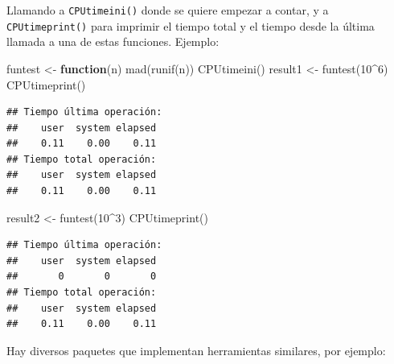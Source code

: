 \documentclass[
]{book}
\newenvironment{Shaded}{\begin{snugshade}}{\end{snugshade}}
\newcommand{\ControlFlowTok}[1]{\textcolor[rgb]{0.13,0.29,0.53}{\textbf{#1}}}
\newcommand{\DecValTok}[1]{\textcolor[rgb]{0.00,0.00,0.81}{#1}}
\newcommand{\FunctionTok}[1]{\textcolor[rgb]{0.00,0.00,0.00}{#1}}
\newcommand{\NormalTok}[1]{#1}
\newcommand{\OtherTok}[1]{\textcolor[rgb]{0.56,0.35,0.01}{#1}}
\newcommand{\SpecialCharTok}[1]{\textcolor[rgb]{0.00,0.00,0.00}{#1}}
\theoremstyle{break}
\theoremstyle{nonumberplain}
\begin{document}
Llamando a \texttt{CPUtimeini()} donde se quiere empezar a contar,
y a \texttt{CPUtimeprint()} para imprimir el tiempo total
y el tiempo desde la última llamada a una de estas funciones.
Ejemplo:

\begin{Shaded}
\begin{Highlighting}[]
\NormalTok{funtest }\OtherTok{\textless{}{-}} \ControlFlowTok{function}\NormalTok{(n) }\FunctionTok{mad}\NormalTok{(}\FunctionTok{runif}\NormalTok{(n)) }
\FunctionTok{CPUtimeini}\NormalTok{()}
\NormalTok{result1 }\OtherTok{\textless{}{-}} \FunctionTok{funtest}\NormalTok{(}\DecValTok{10}\SpecialCharTok{\^{}}\DecValTok{6}\NormalTok{)}
\FunctionTok{CPUtimeprint}\NormalTok{()}
\end{Highlighting}
\end{Shaded}

\begin{verbatim}
## Tiempo última operación:
##    user  system elapsed 
##    0.11    0.00    0.11 
## Tiempo total operación:
##    user  system elapsed 
##    0.11    0.00    0.11
\end{verbatim}

\begin{Shaded}
\begin{Highlighting}[]
\NormalTok{result2 }\OtherTok{\textless{}{-}} \FunctionTok{funtest}\NormalTok{(}\DecValTok{10}\SpecialCharTok{\^{}}\DecValTok{3}\NormalTok{)}
\FunctionTok{CPUtimeprint}\NormalTok{()}
\end{Highlighting}
\end{Shaded}

\begin{verbatim}
## Tiempo última operación:
##    user  system elapsed 
##       0       0       0 
## Tiempo total operación:
##    user  system elapsed 
##    0.11    0.00    0.11
\end{verbatim}

Hay diversos paquetes que implementan herramientas similares, por ejemplo:
\end{document}
